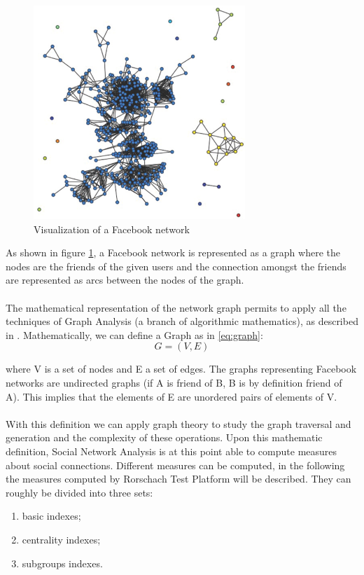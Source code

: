 \begin{figure}[h]
\centering
\includegraphics[width=8cm]{Fig1fbnetwork.eps}
\caption{Visualization of a Facebook network}
\label{fig:fbnetwork}
\end{figure}

As shown in figure \ref{fig:fbnetwork}, a Facebook network is represented as a graph where the nodes are the friends of the given users and the connection amongst the
friends are represented as arcs between the nodes of the graph.\\
\\
The mathematical representation of the network graph permits to apply all the techniques of Graph Analysis (a branch of algorithmic mathematics), as described in
\cite{Biggs-1999}.
Mathematically, we can define a Graph as in \ref{eq:graph}:\\

\begin{equation}
G = (V, E)
\label{eq:graph}
\end{equation}

where V is a set of nodes and E a set of edges.
The graphs representing Facebook networks are undirected graphs (if A is friend of B, B is by definition friend of A).
This implies that the elements of E are unordered pairs of elements of V.\\
\\
With this definition we can apply graph theory to study the graph traversal and generation and the complexity of these operations.
Upon this mathematic definition, Social Network Analysis is at this point able to compute measures about social connections.
Different measures can be computed, in the following the measures computed by Rorschach Test Platform will be described.
They can roughly be divided into three sets:
\begin{enumerate}
\item basic indexes;
\item centrality indexes;
\item subgroups indexes.
\end{enumerate}

